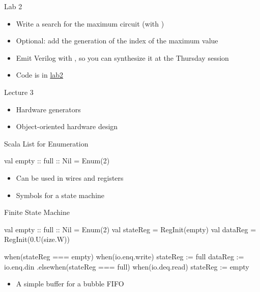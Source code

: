 \begin{frame}[fragile]{Lab 2}
\begin{itemize}
\item Write a search for the maximum circuit (with )
\item Optional: add the generation of the index of the maximum value
\item Emit Verilog with , so you can synthesize it at the Thursday session
\item Code is in \href{https://github.com/schoeberl/agile-hw/tree/main/lab2}{lab2}
\end{itemize}
\end{frame}

\begin{frame}[fragile]{Lecture 3}
\begin{itemize}
\item Hardware generators
\item Object-oriented hardware design
\end{itemize}
\end{frame}


\begin{frame}[fragile]{Scala List for Enumeration}
\begin{chisel}
  val empty :: full :: Nil = Enum(2)
\end{chisel}
\begin{itemize}
\item Can be used in wires and registers
\item Symbols for a state machine
\end{itemize}
\end{frame}

\begin{frame}[fragile]{Finite State Machine}
\begin{chisel}
  val empty :: full :: Nil = Enum(2)
  val stateReg = RegInit(empty)
  val dataReg = RegInit(0.U(size.W))

  when(stateReg === empty) {
    when(io.enq.write) {
      stateReg := full
      dataReg := io.enq.din
    }
  }.elsewhen(stateReg === full) {
    when(io.deq.read) {
      stateReg := empty
    }
  }
\end{chisel}
\begin{itemize}
\item A simple buffer for a bubble FIFO
\end{itemize}
\end{frame}

